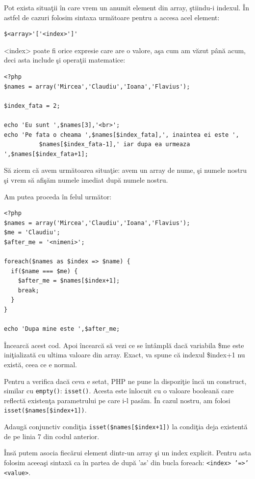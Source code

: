 Pot exista situaţii în care vrem un anumit element din array, ştiindu-i
indexul. În astfel de cazuri folosim sintaxa următoare pentru a accesa
acel element:
\begin{verbatim}
$<array>'['<index>']'
\end{verbatim}
<index> poate fi orice expresie care are o valore, aşa cum am văzut până acum,
deci asta include şi operaţii matematice:
\begin{lstlisting}
<?php
$names = array('Mircea','Claudiu','Ioana','Flavius');

$index_fata = 2;

echo 'Eu sunt ',$names[3],'<br>';
echo 'Pe fata o cheama ',$names[$index_fata],', inaintea ei este ',
		  $names[$index_fata-1],' iar dupa ea urmeaza ',$names[$index_fata+1];
\end{lstlisting}

Să zicem că avem următoarea situaţie: avem un array de nume,
şi numele nostru şi vrem să afişăm numele imediat după numele nostru.

Am putea proceda în felul următor:
\begin{lstlisting}[caption={Indexurile sunt consecutive},label=lst:increment]
<?php
$names = array('Mircea','Claudiu','Ioana','Flavius');
$me = 'Claudiu';
$after_me = '<nimeni>';

foreach($names as $index => $name) {
  if($name === $me) {
	$after_me = $names[$index+1];
	break;
  }
}

echo 'Dupa mine este ',$after_me;
\end{lstlisting}
Încearcă acest cod. Apoi încearcă să vezi ce se întâmplă dacă variabila
\$me este iniţializată cu ultima valoare din array. Exact, va
spune că indexul \$index+1 nu există, ceea ce e normal.

Pentru a verifica dacă ceva e setat, PHP ne pune la dispoziţie
încă un construct, similar cu \texttt{empty()}: \texttt{isset()}.
Acesta este înlocuit cu o valoare booleană care reflectă
existenţa parametrului pe care i-l pasăm. În cazul nostru,
am folosi \texttt{isset(\$names[\$index+1])}.

\begin{Exercise}[title={O conjuncţie în practică}]
Adaugă conjunctiv condiţia \texttt{isset(\$names[\$index+1])} la condiţia
deja existentă de pe linia 7 din codul anterior.
\end{Exercise}

Însă putem asocia fiecărui element dintr-un array şi
un index explicit. Pentru asta folosim aceeaşi sintaxă ca
în partea de după 'as' din bucla foreach: \texttt{<index> '=>' <value>}.

